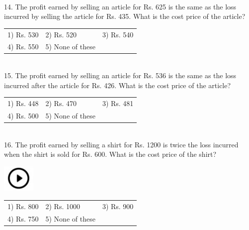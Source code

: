 \documentclass{article}
\begin{document}
	\noindent 
	
	\noindent 
	
	\noindent 
	
	\noindent \\  14. The profit earned by selling an article for Rs. 625 is the same as the loss incurred by selling the article for Rs. 435. What is the cost price of the article?
	
	\noindent 
	\begin{tabular}{p{1.7in} p{1.6in} p{1.6in}} \\ 
 1) Rs. 530                   & 2) Rs. 520            & 3) Rs. 540            \\
4) Rs. 550            & 5) None of these \\
\end{tabular}
	
	\noindent 
	
	\noindent 
	
	\noindent \\  15. The profit earned by selling an article for Rs. 536 is the same as the loss incurred after the article for Rs. 426. What is the cost price of the article?
	
	\noindent 
	\begin{tabular}{p{1.7in} p{1.6in} p{1.6in}} \\ 
 1) Rs. 448                   & 2) Rs. 470            & 3) Rs. 481            \\
4) Rs. 500            & 5) None of these \\
\end{tabular}
\newpage
\noindent \\ 	16. The profit earned by selling a shirt for Rs. 1200 is twice the loss incurred when the shirt is sold for Rs. 600. What is the cost price of the shirt?
	
	\noindent \includegraphics*[width=0.61in, height=0.52in]{images/image1}
	\begin{tabular}{p{1.7in} p{1.6in} p{1.6in}} \\ 
 1) Rs. 800                   & 2) Rs. 1000          & 3) Rs. 900            \\
4) Rs. 750            & 5) None of these \\
\end{tabular}
	
	\noindent 
	
\end{document}
